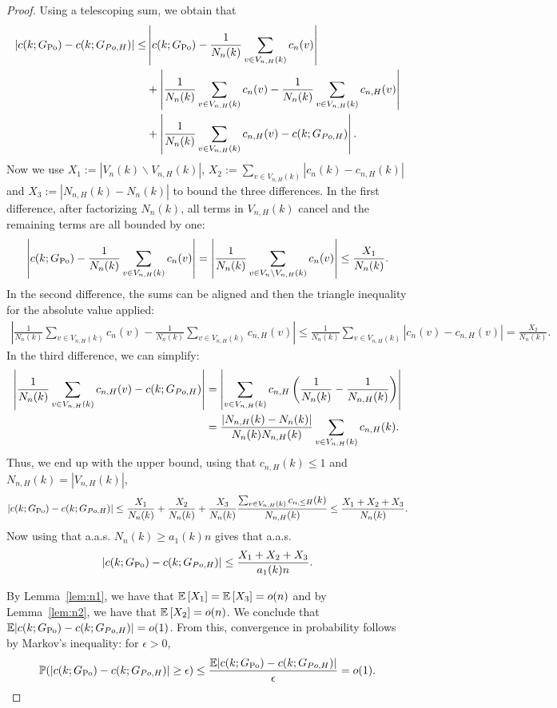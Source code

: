 \begin{proof}
Using a telescoping sum, we obtain that
\begin{align*}
|c(k;G_{{\mathrm{Po}}})-c(k;G_{Po,H})| \leq & \left|c(k;G_{{\mathrm{Po}}})-\frac{1}{N_n(k)}\sum_{v \in V_{n,H}(k)} c_n(v)\right|\\
&+\left|\frac{1}{N_n(k)}\sum_{v \in V_{n,H}(k)} c_n(v) -\frac{1}{N_n(k)}\sum_{v \in V_{n,H}(k)}c_{n,H}(v)\right| \\
&+\left|\frac{1}{N_n(k)}\sum_{v \in V_{n,H}(k)} c_{n, H}(v)-c(k;G_{Po,H})\right|. 
\end{align*}
Now we use $X_1 := |V_n(k)\backslash V_{n,H}(k)|$, $X_2 := \sum_{v \in V_{n,H}(k)}|c_n(k)-c_{n,H}(k)|$ and $X_3 :=|N_{n,H}(k)-N_n(k)|$ to bound the three differences. In the first difference, after factorizing $N_n(k)$, all terms in $V_{n,H}(k)$ cancel and the remaining terms are all bounded by one:
\begin{align*}
\left|c(k;G_{{\mathrm{Po}}})-\frac{1}{N_n(k)}\sum_{v \in V_{n,H}(k)} c_n(v)\right| = \left| \frac{1}{N_n(k)}\sum_{v \in V_n \backslash V_{n,H}(k)} c_n(v) \right| \leq \frac{X_1}{N_n(k)}.
\end{align*}
In the second difference, the sums can be aligned and then the triangle inequality for the absolute value applied:
\begin{align*}
\left|\frac{1}{N_n(k)}\sum_{v \in V_{n,H}(k)} c_n(v) -\frac{1}{N_n(k)}\sum_{v \in V_{n,H}(k)}c_{n,H}(v)\right| \leq \frac{1}{N_n(k)}\sum_{v \in V_{n,H}(k)} \left|c_n(v)-c_{n,H}(v)\right| =\frac{X_2}{N_n(k)}.
\end{align*}
In the third difference, we can simplify:
\begin{align*}
\left|\frac{1}{N_n(k)}\sum_{v \in V_{n,H}(k)} c_{n, H}(v)-c(k;G_{Po,H})\right| &= \left|\sum_{v\in V_{n,H}(k)} c_{n,H} \left(\frac{1}{N_n(k)}-\frac{1}{N_{n,H}(k)}\right)\right| \\
&= \frac{|N_{n,H}(k)-N_n(k)|}{N_n(k)N_{n,H}(k)}\sum_{v \in V_{n,H}(k)}c_{n,H}(k).
\end{align*}
Thus, we end up with the upper bound, using that $c_{n,H}(k) \leq 1$ and $N_{n,H}(k) = |V_{n,H}(k)|$,
\begin{align*}
|c(k;G_{{\mathrm{Po}}})-c(k;G_{Po,H})| \leq \frac{X_1}{N_n(k)}+\frac{X_2}{N_n(k)}+\frac{X_3}{N_n(k)}\frac{\sum_{v \in V_{n,H}(k)}c_{n,\leq H}(k)}{N_{n,H}(k)} \leq \frac{X_1+X_2+X_3}{N_n(k)}.
\end{align*}
Now using that a.a.s. $N_n(k) \geq a_1(k)n$ gives that a.a.s.
\begin{align*}
|c(k;G_{{\mathrm{Po}}})-c(k;G_{Po,H})| \leq \frac{X_1+X_2+X_3}{a_1(k)n}.
\end{align*}

By Lemma~\ref{lem:n1}, we have that $\mathbb{E}\left[ X_1\right] = \mathbb{E}\left[ X_3\right] = o(n)$ and by Lemma~\ref{lem:n2}, we have that $\mathbb{E}\left[ X_2\right] = o(n)$. We conclude that $\mathbb{E} |c(k;G_{{\mathrm{Po}}})-c(k;G_{Po,H})| = o(1)$. From this, convergence in probability follows by Markov's inequality: for $\epsilon >0$, 
\[
	\mathbb{P}(|c(k;G_{{\mathrm{Po}}})-c(k;G_{Po,H})| \geq \epsilon) \leq \frac{\mathbb{E}|c(k;G_{{\mathrm{Po}}})-c(k;G_{Po,H})|}{\epsilon} = o(1).
\]
\end{proof}
